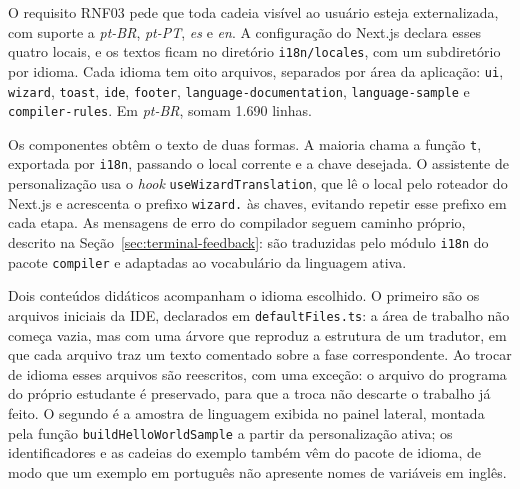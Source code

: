 O requisito RNF03 pede que toda cadeia visível ao usuário esteja externalizada, com suporte a \textit{pt-BR}, \textit{pt-PT}, \textit{es} e \textit{en}. A configuração do Next.js declara esses quatro locais, e os textos ficam no diretório \texttt{i18n/locales}, com um subdiretório por idioma. Cada idioma tem oito arquivos, separados por área da aplicação: \texttt{ui}, \texttt{wizard}, \texttt{toast}, \texttt{ide}, \texttt{footer}, \texttt{language-documentation}, \texttt{language-sample} e \texttt{compiler-rules}. Em \textit{pt-BR}, somam 1.690 linhas.

Os componentes obtêm o texto de duas formas. A maioria chama a função \texttt{t}, exportada por \texttt{i18n}, passando o local corrente e a chave desejada. O assistente de personalização usa o \textit{hook} \texttt{useWizardTranslation}, que lê o local pelo roteador do Next.js e acrescenta o prefixo \texttt{wizard.} às chaves, evitando repetir esse prefixo em cada etapa. As mensagens de erro do compilador seguem caminho próprio, descrito na Seção~\ref{sec:terminal-feedback}: são traduzidas pelo módulo \texttt{i18n} do pacote \texttt{compiler} e adaptadas ao vocabulário da linguagem ativa.

Dois conteúdos didáticos acompanham o idioma escolhido. O primeiro são os arquivos iniciais da IDE, declarados em \texttt{defaultFiles.ts}: a área de trabalho não começa vazia, mas com uma árvore que reproduz a estrutura de um tradutor, em que cada arquivo traz um texto comentado sobre a fase correspondente. Ao trocar de idioma esses arquivos são reescritos, com uma exceção: o arquivo do programa do próprio estudante é preservado, para que a troca não descarte o trabalho já feito. O segundo é a amostra de linguagem exibida no painel lateral, montada pela função \texttt{buildHelloWorldSample} a partir da personalização ativa; os identificadores e as cadeias do exemplo também vêm do pacote de idioma, de modo que um exemplo em português não apresente nomes de variáveis em inglês.

